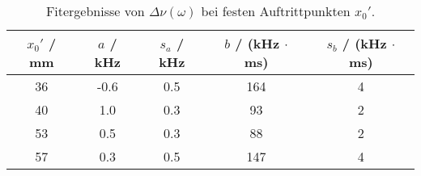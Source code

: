 \begin{table}[H]
\caption{Fitergebnisse von $\Delta \nu(\omega)$ bei festen Auftrittpunkten $x_0'$.}
\begin{center}
\begin{tabular}{|c|c|c|c|c|}
  \hline
  $x_0'$ / mm & $a$ / kHz & $s_{a}$ / kHz & $b$ / (kHz $\cdot$ ms) & $s_b$ / (kHz $\cdot$ ms) \\ \hline
  36 & -0.6 & 0.5 & 164 & 4 \\ \hline
  40 & 1.0 & 0.3 & 93 & 2 \\ \hline
  53 & 0.5 & 0.3 & 88 & 2 \\ \hline
  57 & 0.3 & 0.5 & 147 & 4 \\ \hline
\end{tabular}
\end{center}
\label{tab:fit:T}
\end{table}
